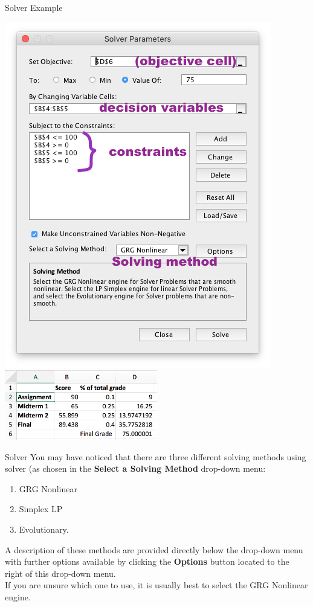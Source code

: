 \documentclass[xcolor=svgnames]{beamer}
\begin{document}
\begin{frame}{Solver Example}
\begin{center}
\includegraphics[height = 0.8\textheight]{solverparameters}
\includegraphics[width = 0.5\textwidth]{solverresult}
\end{center}

\end{frame}


\begin{frame}{Solver}
You may have noticed that there are three different solving methods using solver (as chosen in the {\bf Select a Solving Method} drop-down menu:
\begin{enumerate}
\item       GRG Nonlinear
\item       Simplex LP
\item  Evolutionary.
\end{enumerate}
\medskip
A description of these methods are provided directly below the drop-down menu with further options available by clicking the {\bf Options} button located to the right of this drop-down menu.\\
\medskip
If you are unsure which one to use, it is usually best to select the GRG Nonlinear engine.
\end{frame}
\end{document}
